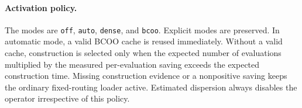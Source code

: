 \paragraph{Activation policy.}
The modes are \texttt{off}, \texttt{auto}, \texttt{dense}, and \texttt{bcoo}.
Explicit modes are preserved. In automatic mode, a valid BCOO cache is reused
immediately. Without a valid cache, construction is selected only when the
expected number of evaluations multiplied by the measured per-evaluation saving
exceeds the expected construction time. Missing construction evidence or a
nonpositive saving keeps the ordinary fixed-routing loader active. Estimated
dispersion always disables the operator irrespective of this policy.

